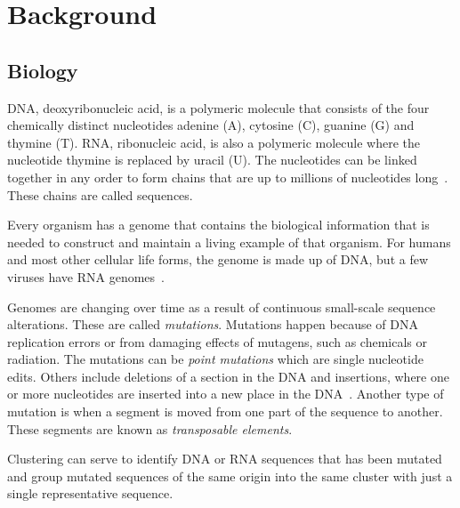 \section{Background}

\subsection{Biology}
\label{sec:biology}

DNA, deoxyribonucleic acid, is a polymeric molecule that consists of the four
chemically distinct nucleotides adenine (A), cytosine (C), guanine (G) and
thymine (T). RNA, ribonucleic acid, is also a polymeric molecule where the
nucleotide thymine is replaced by uracil (U).  The nucleotides can be linked
together in any order to form chains that are up to millions of nucleotides
long~\cite[pp.~8--9]{brown}. These chains are called sequences.

Every organism has a genome that contains the biological information that is
needed to construct and maintain a living example of that organism. For humans
and most other cellular life forms, the genome is made up of DNA, but a few
viruses have RNA genomes~\cite[pp.~3--4]{brown}.

Genomes are changing over time as a result of continuous small-scale sequence
alterations. These are called \textit{mutations}. Mutations happen because of
DNA replication errors or from damaging effects of mutagens, such as chemicals
or radiation. The mutations can be \textit{point mutations} which are single
nucleotide edits. Others include deletions of a section in the DNA and
insertions, where one or more nucleotides are inserted into a new place in the
DNA~\cite[pp.~505--506]{brown}. Another type of mutation is when a segment is
moved from one part of the sequence to another. These segments are known as
\emph{transposable elements}. %

Clustering can serve to identify DNA or RNA sequences that has been mutated and
group mutated sequences of the same origin into the same cluster with just a
single representative sequence.

